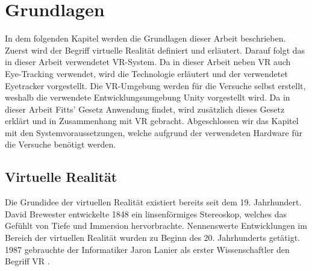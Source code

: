 
\chapter{Grundlagen}
In dem folgenden Kapitel werden die Grundlagen dieser Arbeit beschrieben. Zuerst wird der Begriff virtuelle Realität definiert und erläutert. Darauf folgt das in dieser Arbeit verwendetet \ac{VR}-System. Da in dieser Arbeit neben \ac{VR} auch Eye-Tracking verwendet, wird die Technologie erläutert und der verwendetet Eyetracker vorgestellt. Die \ac{VR}-Umgebung werden für die Versuche selbst erstellt, weshalb die verwendete Entwicklungsumgebung Unity vorgestellt wird. Da in dieser Arbeit Fitts' Gesetz Anwendung findet, wird zusätzlich dieses Gesetz erklärt und in Zusammenhang mit \ac{VR} gebracht. Abgeschlossen wir das Kapitel mit den Systemvoraussetzungen, welche aufgrund der verwendeten Hardware für die Versuche benötigt werden.

\section{Virtuelle Realität}
Die Grundidee der virtuellen Realität existiert bereits seit dem 19. Jahrhundert. David Brewester entwickelte 1848 ein linsenförmiges Stereoskop, welches das Gefühlt von Tiefe und Immersion hervorbrachte. Nennenswerte Entwicklungen im Bereich der virtuellen Realität wurden zu Beginn des 20. Jahrhunderts getätigt. \cite{Singh.2017} 1987 gebrauchte der Informatiker Jaron Lanier als erster Wissenschaftler den Begriff \ac{VR} \cite{Doerner2019}. 

